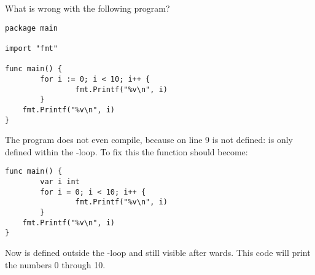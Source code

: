 \begin{Exercise}[title={Scope},difficulty=4]
\label{ex:scope}
\Question\label{ex:scope q1} What is wrong with the following program?

\begin{lstlisting}[numbers=right]
package main

import "fmt"
                                                                                                   
func main() {
        for i := 0; i < 10; i++ {
                fmt.Printf("%v\n", i)
        }
	fmt.Printf("%v\n", i)
}
\end{lstlisting}

\end{Exercise}

\begin{Answer}
\Question
The program does not even compile, because  on line 9 is
not defined:  is only defined within the -loop. To fix
this the function  should become:
\begin{lstlisting}[numbers=none]
func main() {
        var i int
        for i = 0; i < 10; i++ {
                fmt.Printf("%v\n", i)
        }
	fmt.Printf("%v\n", i)
}
\end{lstlisting}
Now  is defined outside the -loop and still visible
after wards. This code will print the numbers 0 through 10.
\end{Answer}
